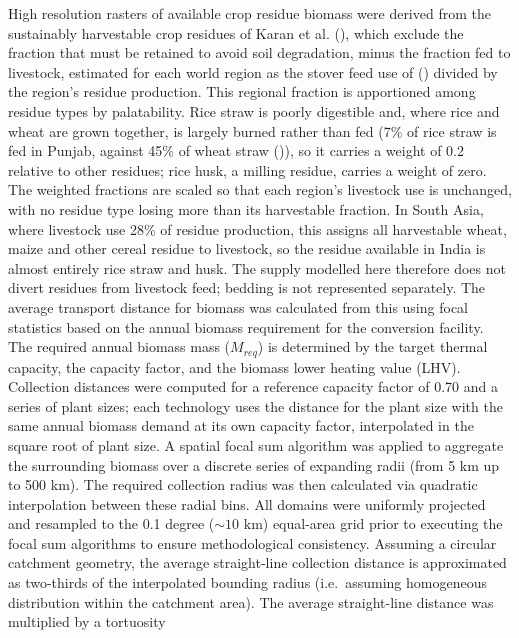 \documentclass[
  letterpaper,
]{article}
\begin{document}
High resolution rasters of available crop residue biomass were derived
from the sustainably harvestable crop residues of Karan et al.
(), which exclude the fraction that
must be retained to avoid soil degradation, minus the fraction fed to
livestock, estimated for each world region as the stover feed use of
() divided by the region's residue
production. This regional fraction is apportioned among residue types by
palatability. Rice straw is poorly digestible and, where rice and wheat
are grown together, is largely burned rather than fed (7\% of rice straw
is fed in Punjab, against 45\% of wheat straw
()), so it carries a weight of 0.2
relative to other residues; rice husk, a milling residue, carries a
weight of zero. The weighted fractions are scaled so that each region's
livestock use is unchanged, with no residue type losing more than its
harvestable fraction. In South Asia, where livestock use 28\% of residue
production, this assigns all harvestable wheat, maize and other cereal
residue to livestock, so the residue available in India is almost
entirely rice straw and husk. The supply modelled here therefore does
not divert residues from livestock feed; bedding is not represented
separately. The average transport distance for biomass was calculated
from this using focal statistics based on the annual biomass requirement
for the conversion facility. The required annual biomass mass
(\(M_{req}\)) is determined by the target thermal capacity, the capacity
factor, and the biomass lower heating value (LHV). Collection distances
were computed for a reference capacity factor of 0.70 and a series of
plant sizes; each technology uses the distance for the plant size with
the same annual biomass demand at its own capacity factor, interpolated
in the square root of plant size. A spatial focal sum algorithm was
applied to aggregate the surrounding biomass over a discrete series of
expanding radii (from 5 km up to 500 km). The required collection radius
was then calculated via quadratic interpolation between these radial
bins. All domains were uniformly projected and resampled to the 0.1
degree (\(\sim 10\text{ km}\)) equal-area grid prior to executing the
focal sum algorithms to ensure methodological consistency. Assuming a
circular catchment geometry, the average straight-line collection
distance is approximated as two-thirds of the interpolated bounding
radius (i.e.~assuming homogeneous distribution within the catchment
area). The average straight-line distance was multiplied by a tortuosity
\end{document}
